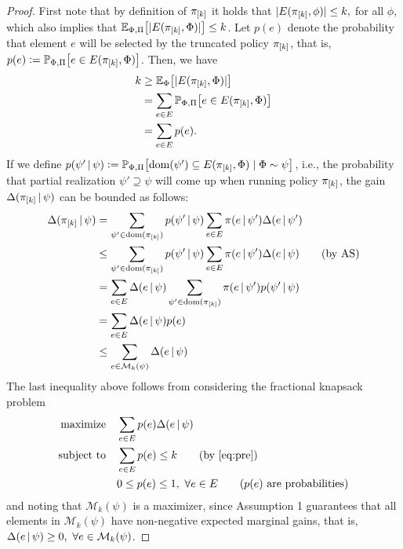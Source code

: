 \begin{proof}
  First note that by definition of $\pi_{[k]}$ it holds that $|E(\pi_{[k]}, \phi)| \leq k,$ for all $\phi$, which also implies that $\Epp\left[|E(\pik, \Phi)|\right] \leq k$.
  Let $p(e)$ denote the probability that element $e$ will be selected by the truncated policy $\pi_{[k]}$, that is, $p(e) \defeq \Ppp\left[e \in E(\pik, \Phi)\right]$.
  Then, we have
  \begin{align}
    \label{eq:pre}
    \begin{split}
      k &\geq \Ephi\left[|E(\pik, \Phi)|\right]\\
        &= \sum_{e \in E}\Ppp\left[e \in E(\pik, \Phi)\right]\\
        &= \sum_{e \in E}p(e).
    \end{split}
  \end{align}
  If we define $p(\psi'\mmid\psi) \defeq \Ppp\left[\dom(\psi') \subseteq E(\pik, \Phi) \mid \Phi \sim \psi\right]$, i.e., the probability that partial realization $\psi' \supseteq \psi$ will come up when running policy $\pi_{[k]}$, the gain $\Delta(\pi_{[k]}\,\vert\,\psi)$ can be bounded as follows:
  \begin{align*}
    \Delta(\pi_{[k]}\,\vert\,\psi) &= \sum_{\psi' \in \operatorname{dom}(\pi_{[k]})}p(\psi'\,\vert\,\psi)\sum_{e \in E}\pi(e\,\vert\,\psi')\Delta(e\,\vert\,\psi')\\
    &\leq \sum_{\psi' \in \operatorname{dom}(\pi_{[k]})}p(\psi'\,\vert\,\psi)\sum_{e \in E}\pi(e\,\vert\,\psi')\Delta(e\,\vert\,\psi) \tag*{(by AS)}\\
    &= \sum_{e \in E}\Delta(e\,\vert\,\psi) \sum_{\psi' \in \operatorname{dom}(\pi_{[k]})}\pi(e\,\vert\,\psi')p(\psi'\,\vert\,\psi)\\
    &= \sum_{e \in E}\Delta(e\,\vert\,\psi) p(e)\\
    &\leq \sum_{e \in \mathcal{M}_k(\psi)} \Delta(e\,\vert\,\psi)
  \end{align*}
  The last inequality above follows from considering the fractional knapsack problem
  \begin{align*}
    \textrm{maximize} & \quad \sum_{e \in E}p(e)\D(e\mmid\psi)\\
    \textrm{subject to} & \quad \sum_{e \in E}p(e) \leq k \tag*{(by \eqref{eq:pre})}\\
               & \quad 0 \leq p(e) \leq 1,\ \forall e \in E \tag*{($p(e)$ are probabilities)}
  \end{align*}
  and noting that $\mathcal{M}_k(\psi)$ is a maximizer, since Assumption 1 guarantees that all elements in  $\mathcal{M}_k(\psi)$ have non-negative expected marginal gains, that is, $\Delta(e\,\vert\,\psi) \geq 0,\ \forall e \in \mathcal{M}_k(\psi)$.
\end{proof}

